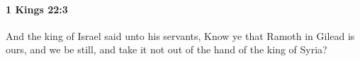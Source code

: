 
		\paragraph{1 Kings 22:3} %
			\label{1KINGS-22-3}

			And the king of Israel said unto his servants, Know ye that Ramoth in Gilead is ours, and we be still, and take it not out of the hand of the king of Syria?


